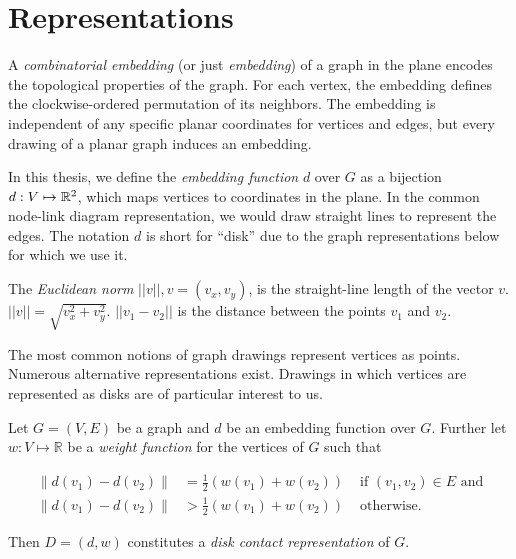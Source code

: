 \section{Representations}

A \emph{combinatorial embedding} (or just \emph{embedding}) of a graph in the plane encodes the topological properties of the graph. For each vertex, the embedding defines the clockwise-ordered permutation of its neighbors. The embedding is independent of any specific planar coordinates for vertices and edges, but every drawing of a planar graph induces an embedding.

In this thesis, we define the \emph{embedding function} $d$ over $G$ as a bijection $d: V \mapsto \mathbb R^2$, which maps vertices to coordinates in the plane. In the common node-link diagram representation, we would draw straight lines to represent the edges. The notation $d$ is short for ``disk'' due to the graph representations below for which we use it.


The \emph{Euclidean norm} $||v||, v = (v_x, v_y)$, is the straight-line length of the vector $v$. $||v|| = \sqrt{v_x^2 + v_y^2}$. $||v_1 - v_2||$ is the distance between the points $v_1$ and $v_2$.

The most common notions of graph drawings represent vertices as points. Numerous alternative representations exist. Drawings in which vertices are represented as disks are of particular interest to us.

\begin{definition}
\label{def:ch2_DCR}
Let $G = (V, E)$ be a graph and $d$ be an embedding function over $G$. Further let $w: V \mapsto \mathbb R$ be a \emph{weight function} for the vertices of $G$ such that

\begin{align*}
\lVert d(v_1) - d(v_2) \rVert &= \frac12(w(v_1) + w(v_2)) &\text{ if } (v_1, v_2) \in E \text{ and} \\ \lVert d(v_1) - d(v_2) \rVert &> \frac12(w(v_1) + w(v_2)) &\text{ otherwise.}
\end{align*}

Then $D = (d, w)$ constitutes a \emph{disk contact representation} of $G$.
\end{definition}

